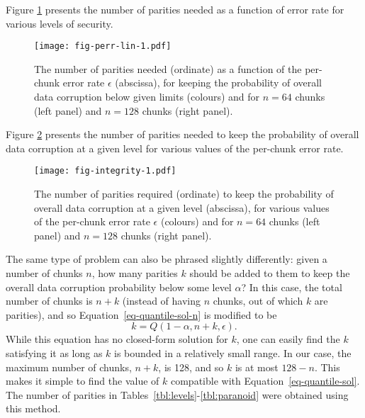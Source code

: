 \documentclass[a4paper,11pt]{article}
\begin{document}
Figure \ref{fig:perr-lin} presents the number of parities needed as a function of error rate for various levels of security.
\begin{figure}[!ht]
  \centering
  \texttt{[image: fig-perr-lin-1.pdf]}
  \caption{The number of parities needed (ordinate) as a function of the per-chunk error rate $\epsilon$ (abscissa), for keeping the probability of overall data corruption below given limits (colours) and for $n = 64$ chunks (left panel) and $n = 128$ chunks (right panel).}
  \label{fig:perr-lin}
\end{figure}
Figure \ref{fig:integrity}  
presents the number of parities needed to keep the probability of overall data corruption at a given level for various values of the per-chunk error rate.
\begin{figure}[!ht]
  \centering
  \texttt{[image: fig-integrity-1.pdf]}
  \caption{The number of parities required (ordinate) to keep the probability of overall data corruption at a given level (abscissa), for various values of the per-chunk error rate $\epsilon$ (colours) and for $n = 64$ chunks (left panel) and $n = 128$ chunks (right panel).}
  \label{fig:integrity}
\end{figure}

The same type of problem can also be phrased slightly differently: given a number of chunks $n$, how many parities $k$ should be added to them to keep the overall data corruption probability below some level $\alpha$? In this case, the total number of chunks is $n + k$ (instead of having $n$ chunks, out of which $k$ are parities), and so Equation~\ref{eq-quantile-sol-n} is modified to be
\begin{equation}
  k = Q(1 - \alpha, n + k, \epsilon) .
  \label{eq-quantile-sol}
\end{equation}
While this equation has no closed-form solution for $k$, one can easily find the $k$ satisfying it as long as $k$ is bounded in a relatively small range. In our case, the maximum number of chunks, $n + k$, is 128, and so $k$ is at most $128-n$. This makes it simple to find the value of $k$ compatible with Equation~\ref{eq-quantile-sol}. The number of parities in Tables~\ref{tbl:levels}-\ref{tbl:paranoid} were obtained using this method.
\end{document}
